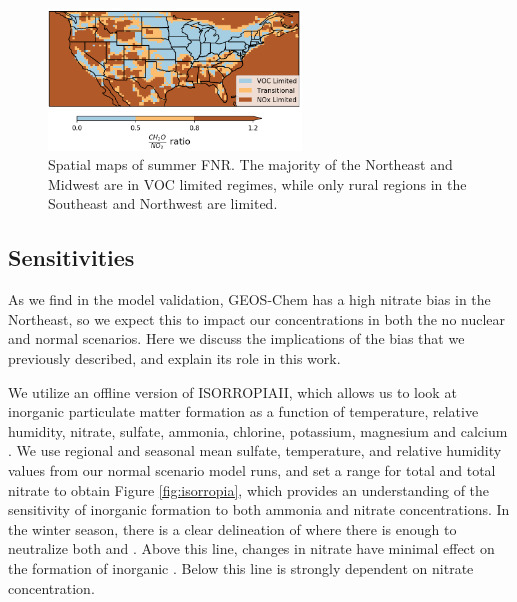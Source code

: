 \documentclass[12]{article}
\begin{document}
\begin{figure}[!htbp]
    \centering
    \includegraphics[width=0.6\textwidth]{ego_nonuclear_project/Figures/summer_regime_national_ratio.png}
    \caption{Spatial maps of summer FNR. The majority of the Northeast and Midwest are in VOC limited regimes, while only rural regions in the Southeast and Northwest are  limited.} 
    \label{fig:summer_FNR}
\end{figure}

\subsection{ Sensitivities}\label{sec:PM25}
As we find in the model validation, GEOS-Chem has a high nitrate bias in the Northeast, so we expect this to impact our  concentrations in both the no nuclear and normal scenarios. Here we discuss the implications of the bias that we previously described, and explain its role in this work.

We utilize an offline version of ISORROPIAII, which allows us to look at inorganic particulate matter formation as a function of temperature, relative humidity, nitrate, sulfate, ammonia, chlorine, potassium, magnesium and calcium \citep{fountoukis_isorropia_2007}. We use regional and seasonal mean sulfate, temperature, and relative humidity values from our normal scenario model runs, and set a range for total  and total nitrate to obtain Figure \ref{fig:isorropia}, which provides an understanding of the sensitivity of inorganic  formation to both ammonia and nitrate concentrations. In the winter season, there is a clear delineation of where there is enough  to neutralize both  and . Above this line, changes in nitrate have minimal effect on the formation of inorganic . Below this line  is strongly dependent on nitrate concentration. 
\end{document}
